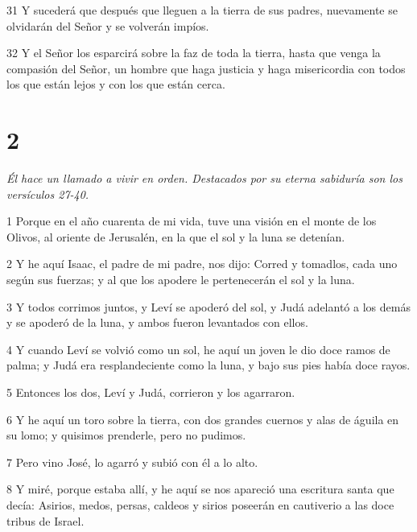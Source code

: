 \par 31 Y sucederá que después que lleguen a la tierra de sus padres, nuevamente se olvidarán del Señor y se volverán impíos.

\par 32 Y el Señor los esparcirá sobre la faz de toda la tierra, hasta que venga la compasión del Señor, un hombre que haga justicia y haga misericordia con todos los que están lejos y con los que están cerca.



\chapter{2}

\par \textit{Él hace un llamado a vivir en orden. Destacados por su eterna sabiduría son los versículos 27-40.}

\par 1 Porque en el año cuarenta de mi vida, tuve una visión en el monte de los Olivos, al oriente de Jerusalén, en la que el sol y la luna se detenían.

\par 2 Y he aquí Isaac, el padre de mi padre, nos dijo: Corred y tomadlos, cada uno según sus fuerzas; y al que los apodere le pertenecerán el sol y la luna.

\par 3 Y todos corrimos juntos, y Leví se apoderó del sol, y Judá adelantó a los demás y se apoderó de la luna, y ambos fueron levantados con ellos.

\par 4 Y cuando Leví se volvió como un sol, he aquí un joven le dio doce ramos de palma; y Judá era resplandeciente como la luna, y bajo sus pies había doce rayos.

\par 5 Entonces los dos, Leví y Judá, corrieron y los agarraron.

\par 6 Y he aquí un toro sobre la tierra, con dos grandes cuernos y alas de águila en su lomo; y quisimos prenderle, pero no pudimos.

\par 7 Pero vino José, lo agarró y subió con él a lo alto.

\par 8 Y miré, porque estaba allí, y he aquí se nos apareció una escritura santa que decía: Asirios, medos, persas, caldeos y sirios poseerán en cautiverio a las doce tribus de Israel.

